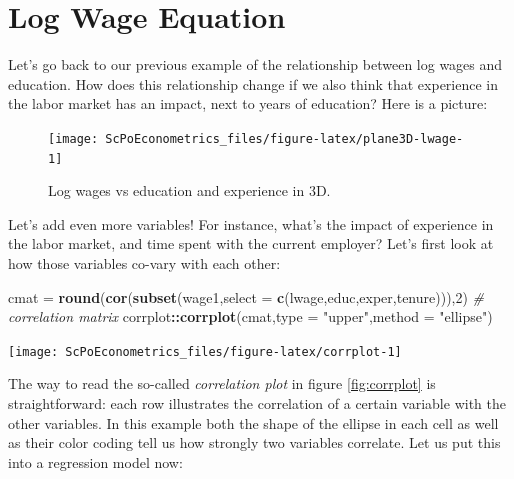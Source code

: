\documentclass[]{book}
\newenvironment{Shaded}{\begin{snugshade}}{\end{snugshade}}
\newcommand{\CommentTok}[1]{\textcolor[rgb]{0.56,0.35,0.01}{\textit{#1}}}
\newcommand{\DataTypeTok}[1]{\textcolor[rgb]{0.13,0.29,0.53}{#1}}
\newcommand{\DecValTok}[1]{\textcolor[rgb]{0.00,0.00,0.81}{#1}}
\newcommand{\KeywordTok}[1]{\textcolor[rgb]{0.13,0.29,0.53}{\textbf{#1}}}
\newcommand{\NormalTok}[1]{#1}
\newcommand{\OperatorTok}[1]{\textcolor[rgb]{0.81,0.36,0.00}{\textbf{#1}}}
\newcommand{\StringTok}[1]{\textcolor[rgb]{0.31,0.60,0.02}{#1}}
\begin{document}
\hypertarget{log-wage-equation}{%
\section{Log Wage Equation}\label{log-wage-equation}}

Let's go back to our previous example of the relationship between log wages and education. How does this relationship change if we also think that experience in the labor market has an impact, next to years of education? Here is a picture:

\begin{figure}

{\centering \texttt{[image: ScPoEconometrics\_files/figure-latex/plane3D-lwage-1]} 

}

\caption{Log wages vs education and experience in 3D.}\label{fig:plane3D-lwage}
\end{figure}

Let's add even more variables! For instance, what's the impact of experience in the labor market, and time spent with the current employer? Let's first look at how those variables co-vary with each other:

\begin{Shaded}
\begin{Highlighting}[]
\NormalTok{cmat =}\StringTok{ }\KeywordTok{round}\NormalTok{(}\KeywordTok{cor}\NormalTok{(}\KeywordTok{subset}\NormalTok{(wage1,}\DataTypeTok{select =} \KeywordTok{c}\NormalTok{(lwage,educ,exper,tenure))),}\DecValTok{2}\NormalTok{) }\CommentTok{# correlation matrix}
\NormalTok{corrplot}\OperatorTok{::}\KeywordTok{corrplot}\NormalTok{(cmat,}\DataTypeTok{type =} \StringTok{"upper"}\NormalTok{,}\DataTypeTok{method =} \StringTok{"ellipse"}\NormalTok{)}
\end{Highlighting}
\end{Shaded}

\begin{center}\texttt{[image: ScPoEconometrics\_files/figure-latex/corrplot-1]} \end{center}

The way to read the so-called \emph{correlation plot} in figure \ref{fig:corrplot} is straightforward: each row illustrates the correlation of a certain variable with the other variables. In this example both the shape of the ellipse in each cell as well as their color coding tell us how strongly two variables correlate. Let us put this into a regression model now:
\end{document}
